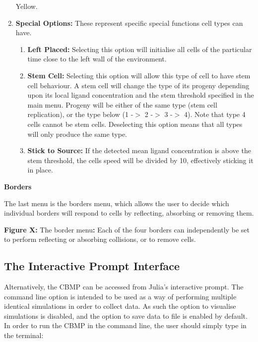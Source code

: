 \documentclass[12pt,a4paper]{report}
\begin{document}
\begin{enumerate}
Yellow.
\item {\bfseries Special Options: }These represent specific special 
functions cell types can have.
\begin{enumerate}
\item {\bfseries Left Placed: }Selecting this option will initialise all 
cells of the particular time close to the left wall of the environment.
\item {\bfseries Stem Cell: }Selecting this option will allow this type 
of cell to have stem cell behaviour. A stem cell will change the type of 
its progeny depending upon its local ligand concentration and the stem 
threshold specified in the main menu. Progeny will be either of the same 
type (stem cell replication), or the type below (1 -$>$ 2 -$>$ 3 -$>$ 
4). Note that type 4 cells cannot be stem cells. Deselecting this option 
means that all types will only produce the same type.
\item {\bfseries Stick to Source: }If the detected mean ligand 
concentration is above the stem threshold, the cells speed will be 
divided by 10, effectively sticking it in place. 
\setcounter{numberedCntE}{\theenumi}
\end{enumerate}
\end{enumerate}


{\bfseries Borders}

The last menu is the borders menu, which allows the user to decide which 
individual borders will respond to cells by reflecting, absorbing or 
removing them.

\begin{figure}[H]
\centering
\end{figure}


{\bfseries Figure X: }The border menu{\bfseries : }Each of the four 
borders can independently be set to perform reflecting or absorbing 
collisions, or to remove cells.



\subsection{The Interactive Prompt 
Interface}
Alternatively, the CBMP can be accessed from Julia's interactive prompt. 
The command line option is intended to be used as a way of performing 
multiple identical simulations in order to collect data. As such the 
option to visualise simulations is disabled, and the option to save data 
to file is enabled by default. In order to run the CBMP in the command 
line, the user should simply type in the terminal:
\end{document}
